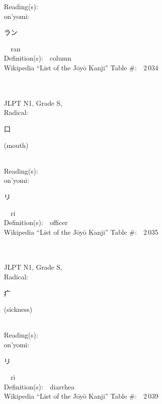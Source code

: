 \begin{multicols}{2}
Reading(s):\ \ \\
{\hspace*{1em}}on'yomi:\ \ \\
{\hspace*{2em}}{\begin{CJK}{UTF8}{min} ラン \end{CJK}}\ \ ran\ \ \\
Definition(s):\ \ column \\
Wikipedia ``List of the J\=oy\=o Kanji'' Table \#:\ \ 2\,034 \\
\ \ \\
{\fontsize{34pt}{40pt}  }\ \ \\
{JLPT N1, Grade S, \\Radical:\ \ {\begin{CJK}{UTF8}{min} 口 \end{CJK}} (mouth) } \\
Reading(s):\ \ \\
{\hspace*{1em}}on'yomi:\ \ \\
{\hspace*{2em}}{\begin{CJK}{UTF8}{min} リ \end{CJK}}\ \ ri\ \ \\
Definition(s):\ \ officer \\
Wikipedia ``List of the J\=oy\=o Kanji'' Table \#:\ \ 2\,035 \\
\ \ \\
{\fontsize{34pt}{40pt}  }\ \ \\
{JLPT N1, Grade S, \\Radical:\ \ {\begin{CJK}{UTF8}{min} 疒 \end{CJK}} (sickness) } \\
Reading(s):\ \ \\
{\hspace*{1em}}on'yomi:\ \ \\
{\hspace*{2em}}{\begin{CJK}{UTF8}{min} リ \end{CJK}}\ \ ri\ \ \\
Definition(s):\ \ diarrhea \\
Wikipedia ``List of the J\=oy\=o Kanji'' Table \#:\ \ 2\,039 \\

\end{multicols}
